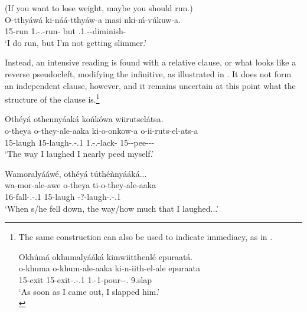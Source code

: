 \documentclass[output=paper]{langscibook}
\begin{document}
\ex
\label{bkm:Ref110331993}
(If you want to lose weight, maybe you should run.)\\
\gll
O-tthyáwá  ki-náá-tthyáw-a  masi  nki-ḿ-vúkuw-a.\\
15-run  1\SG{}.\SM{}-\PRS{}.\DJ{}-run-\FV{}  but  \NEG{}.1\SG{}.\SM{}-\PRS{}-diminish-\FV{}\\
\glt
‘I do run, but I’m not getting slimmer.’\\


\z

Instead, an intensive reading is found with a relative clause, or what looks like a reverse pseudocleft, modifying the infinitive, as illustrated in . It does not form an independent clause, however, and it remains uncertain at this point what the structure of the clause is.\footnote{The same construction can also be used to indicate immediacy, as in .\largerpage[2.25]

\ea
\label{ex:slappedhim}
Okhúmá okhumalyááká kimwiitthenlé epuraatá.\\
\gll
o-khuma  o-khum-ale-aaka  ki-n-iith-el-ale  epuraata\\
15-exit  15-exit-\PFV{}.\REL{}-\POSS{}.1\SG{}  1\SG{}.\SM{}-1\OM{}-pour-\APPL{}-\PFV{}.\CJ{}  9.slap\\
\glt
‘As soon as I came out, I slapped him.’\\
\zlast
}

\ea
\label{bkm:Ref129163666}
Othéyá othennyáaká końkówa wiirutselátsa.\\
\gll
o-theya  o-they-ale-aaka  ki-o-onkow-a  o-ii-ruts-el-ats-a\\
15-laugh  15-laugh-\PFV{}.\REL{}-\POSS{}.1\SG{}  1\SG{}.\SM{}-\PFV{}.\DJ{}-lack-\FV{}  15-\REFL{}-pee-\APPL{}-\PLUR{}-\FV{}\\
\glt
‘The way I laughed I nearly peed myself.’\\


\z

\ea
Wamoralyááwé, othéyá túthé\`{n}nyááká...\\
\gll
wa-mor-ale-awe  o-theya  ti-o-they-ale-aaka\\
16-fall-\PFV{}.\REL{}-\POSS{}.1  15-laugh  \COP{}-?-laugh-\PFV{}.\REL{}-\POSS{}.1\SG{}\\
\glt
‘When s/he fell down, the way/how much that I laughed...’\\
\end{document}

